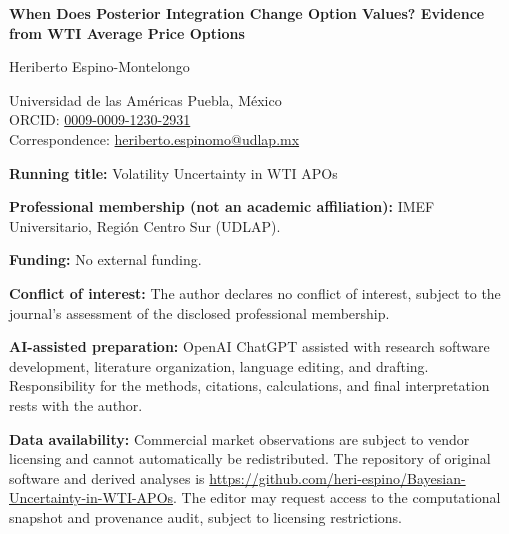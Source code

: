 \documentclass[11pt]{article}
\begin{document}
\begin{center}
{\Large\bfseries When Does Posterior Integration Change Option Values?
Evidence from WTI Average Price Options\par}
\vspace{1em}
{\large Heriberto Espino-Montelongo\par}
Universidad de las Am\'ericas Puebla, M\'exico\\
ORCID: \href{https://orcid.org/0009-0009-1230-2931}{0009-0009-1230-2931}\\
Correspondence: \href{mailto:heriberto.espinomo@udlap.mx}{heriberto.espinomo@udlap.mx}
\end{center}
\medskip
\noindent\textbf{Running title:} Volatility Uncertainty in WTI APOs

\medskip
\noindent\textbf{Professional membership (not an academic affiliation):}
IMEF Universitario, Regi\'on Centro Sur (UDLAP).

\medskip
\noindent\textbf{Funding:} No external funding.

\medskip
\noindent\textbf{Conflict of interest:} The author declares no conflict of interest,
subject to the journal's assessment of the disclosed professional membership.

\medskip
\noindent\textbf{AI-assisted preparation:} OpenAI ChatGPT assisted with research
software development, literature organization, language editing, and drafting.
Responsibility for the methods, citations, calculations, and final interpretation
rests with the author.

\medskip
\noindent\textbf{Data availability:} Commercial market observations are subject
to vendor licensing and cannot automatically be redistributed. The repository
of original software and derived analyses is
\url{https://github.com/heri-espino/Bayesian-Uncertainty-in-WTI-APOs}.
The editor may request access to the computational snapshot and provenance
audit, subject to licensing restrictions.
\end{document}
